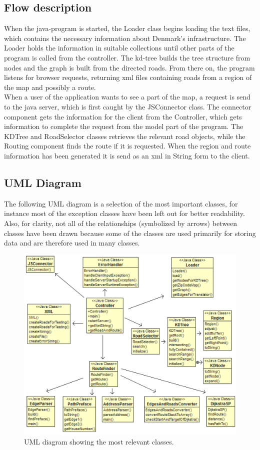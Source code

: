 \documentclass[a4paper,10pt,titlepage]{article}
\begin{document}
		\subsection{Flow description}
		When the java-program is started, the Loader class begins loading the text files, which contains the necessary information about Denmark’s infrastructure. The Loader holds the information in suitable collections until other parts of the program is called from the controller. The kd-tree builds the tree structure from nodes and the graph is built from the directed roads. From there on, the program listens for browser requests, returning xml files containing roads from a region of the map and possibly a route.\\
When a user of the application wants to see a part of the map, a request is send to the java server, which is first caught by the JSConnector class.  The connector component gets the information for the client from the Controller, which gets information to complete the request from the model part of the program. The KDTree and RoadSelector classes retrieves the relevant road objects, while the Routing component finds the route if it is requested. When the region and route information has been generated it is send as an xml in String form to the client. 

		\subsection{UML Diagram}
		The following UML diagram is a selection of the most important classes, for instance most of the exception classes have been left out for better readability. Also, for clarity, not all of the relationships (symbolized by arrows) between classes have been drawn because some of the classes are used primarily for storing data and are therefore used in many classes. 
		\begin{figure}[H]
\includegraphics[width=120mm]{umlArrows.png}
\caption{UML diagram showing the most relevant classes.}
\label{fig:uml}
\end{figure}
		
\end{document}
